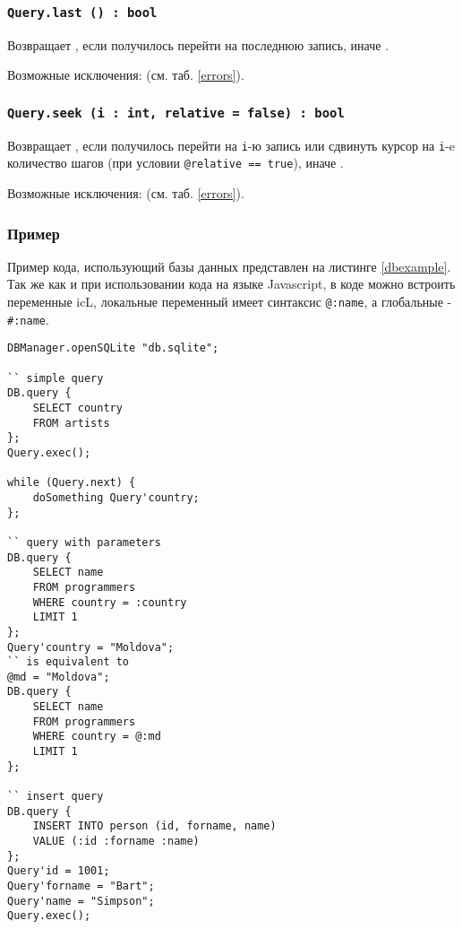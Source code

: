 \subsubsection{\texttt{Query.last () : bool}}

Возвращает \true, если получилось перейти на последнюю запись, иначе \false.

Возможные исключения:  (см. таб. \ref{errors}).

\subsubsection{\texttt{Query.seek (i : int, relative = false) : bool}}

Возвращает \true, если получилось перейти на \texttt{i}-ю запись или сдвинуть курсор на \texttt{i}-e количество шагов (при условии \texttt{@relative == true}), иначе \false.

Возможные исключения:  (см. таб. \ref{errors}).

\subsubsection{Пример}

Пример кода, использующий базы данных представлен на листинге \ref{dbexample}. Так же как и при использовании кода на языке Javascript, в коде можно встроить переменные icL, локальные переменный имеет синтаксис \texttt{@:name}, а глобальные - \texttt{\#:name}.

\begin{sourcecode}
\label{dbexample}
\begin{verbatim}
DBManager.openSQLite "db.sqlite";

`` simple query
DB.query {
	SELECT country
	FROM artists
};
Query.exec();

while (Query.next) {
    doSomething Query'country;
};

`` query with parameters
DB.query {
	SELECT name
	FROM programmers
	WHERE country = :country
	LIMIT 1
};
Query'country = "Moldova";
`` is equivalent to
@md = "Moldova";
DB.query {
	SELECT name
	FROM programmers
	WHERE country = @:md
	LIMIT 1
};

`` insert query
DB.query {
	INSERT INTO person (id, forname, name)
	VALUE (:id :forname :name)
};
Query'id = 1001;
Query'forname = "Bart";
Query'name = "Simpson";
Query.exec();
\end{verbatim}
\end{sourcecode}

